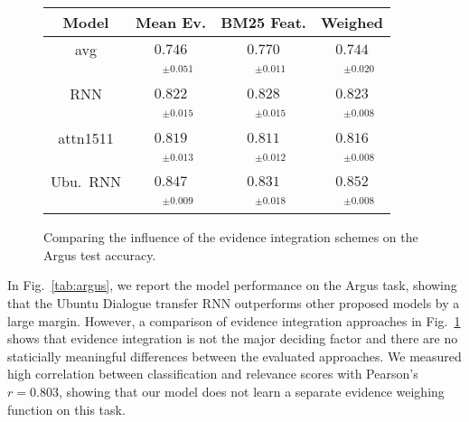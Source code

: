 \documentclass[11pt]{article}
\begin{document}
\begin{figure}[t]
\centering
\setlength{\tabcolsep}{3pt}
\begin{tabular}{|c|c|c|c|}
\hline
Model              & Mean Ev. & BM25 Feat. & Weighed \\
\hline
avg & $0.746$ & $0.770$ & $0.744$\\
 & $\quad^{\pm0.051}$ & $\quad^{\pm0.011}$ & $\quad^{\pm0.020}$\\
\hline
RNN & $0.822$ & $0.828$ & $0.823$\\
 & $\quad^{\pm0.015}$ & $\quad^{\pm0.015}$ & $\quad^{\pm0.008}$\\
attn1511 & $0.819$ & $0.811$ & $0.816$\\
 & $\quad^{\pm0.013}$ & $\quad^{\pm0.012}$ & $\quad^{\pm0.008}$\\
Ubu.\ RNN & $0.847$ & $0.831$ & $0.852$\\
 & $\quad^{\pm0.009}$ & $\quad^{\pm0.018}$ & $\quad^{\pm0.008}$\\
\hline
\end{tabular}
\setlength{\tabcolsep}{6pt}
\vspace*{-0.2cm}
\caption{\footnotesize%
	Comparing the influence of the evidence integration schemes on the Argus test accuracy.
}
\label{tab:argusev}
\end{figure}

In Fig.~\ref{tab:argus}, we report the model performance on the Argus task,
showing that the Ubuntu Dialogue transfer RNN outperforms other proposed
models by a large margin.  However, a comparison of evidence integration
approaches in Fig.~\ref{tab:argusev} shows that
evidence integration is not the major deciding factor and there are no
staticially meaningful differences between the evaluated approaches.
We measured high correlation between classification and relevance scores
with Pearson's $r = 0.803$, showing that our model does not learn a separate
evidence weighing function on this task.
\end{document}
